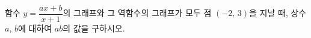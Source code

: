 \hspace*{2mm}\begin{minipage}[t]{\dimexpr\linewidth-2mm\relax}\vspace{0pt}
함수 $y=\dfrac{ax+b}{x+1}$의 그래프와 그 역함수의 그래프가 모두 점 $(-2,\,3)$을 지날 때, 상수 $a$, $b$에 대하여 $ab$의 값을 구하시오.\end{minipage}
